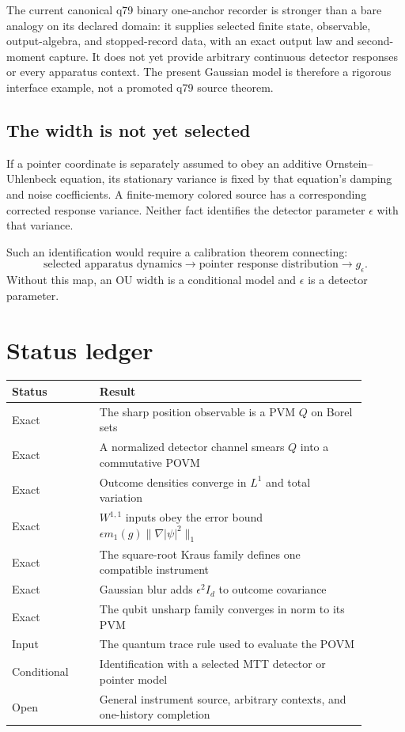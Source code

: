 \documentclass[11pt]{article}
\begin{document}
The current canonical q79 binary one-anchor recorder is stronger than a bare
analogy on its declared domain: it supplies selected finite state, observable,
output-algebra, and stopped-record data, with an exact output law and
second-moment capture. It does not yet provide arbitrary continuous detector
responses or every apparatus context. The present Gaussian model is therefore
a rigorous interface example, not a promoted q79 source theorem.

\subsection*{The width is not yet selected}

If a pointer coordinate is separately assumed to obey an additive
Ornstein--Uhlenbeck equation, its stationary variance is fixed by that
equation's damping and noise coefficients. A finite-memory colored source has
a corresponding corrected response variance. Neither fact identifies the
detector parameter \(\epsilon\) with that variance.

Such an identification would require a calibration theorem connecting:
\[
\text{selected apparatus dynamics}
\longrightarrow
\text{pointer response distribution}
\longrightarrow
g_\epsilon.
\]
Without this map, an OU width is a conditional model and
\(\epsilon\) is a detector parameter.

\section{Status ledger}

\begin{center}
\begin{tabular}{p{0.22\linewidth}p{0.67\linewidth}}
\toprule
Status & Result\\
\midrule
Exact & The sharp position observable is a PVM \(Q\) on Borel sets\\
Exact & A normalized detector channel smears \(Q\) into a commutative POVM\\
Exact & Outcome densities converge in \(L^1\) and total variation\\
Exact & \(W^{1,1}\) inputs obey the error bound
\(\epsilon m_1(g)\|\nabla|\psi|^2\|_1\)\\
Exact & The square-root Kraus family defines one compatible instrument\\
Exact & Gaussian blur adds \(\epsilon^2I_d\) to outcome covariance\\
Exact & The qubit unsharp family converges in norm to its PVM\\
Input & The quantum trace rule used to evaluate the POVM\\
Conditional & Identification with a selected MTT detector or pointer model\\
Open & General instrument source, arbitrary contexts, and one-history
completion\\
\bottomrule
\end{tabular}
\end{center}
\end{document}
